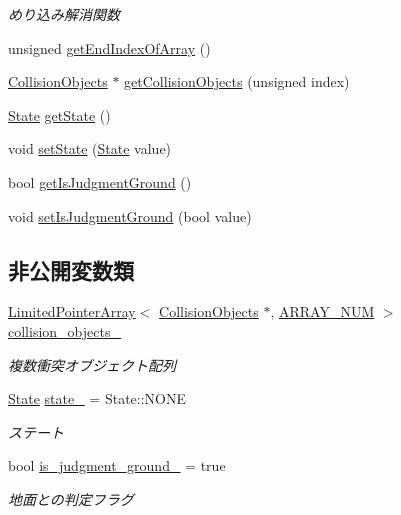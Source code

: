 \begin{DoxyCompactItemize}
\begin{DoxyCompactList}\small\item\em めり込み解消関数 \end{DoxyCompactList}\item 
unsigned \mbox{\hyperlink{class_collision_base_ac1d7000c820fabfa604138cda30a40a1}{get\+End\+Index\+Of\+Array}} ()
\item 
\mbox{\hyperlink{class_collision_objects}{Collision\+Objects}} $\ast$ \mbox{\hyperlink{class_collision_base_a2e54e04c6ebd809ac2bc955083fec61c}{get\+Collision\+Objects}} (unsigned index)
\item 
\mbox{\hyperlink{class_collision_base_a4dd1ed00099a19c0176913af93c4e365}{State}} \mbox{\hyperlink{class_collision_base_af4e773951a4e1965e64410841a0292a4}{get\+State}} ()
\item 
void \mbox{\hyperlink{class_collision_base_a01db1e666b8e71c33969e9ab6bbc724e}{set\+State}} (\mbox{\hyperlink{class_collision_base_a4dd1ed00099a19c0176913af93c4e365}{State}} value)
\item 
bool \mbox{\hyperlink{class_collision_base_a7b9cd927976308f8719f3becc03b99a1}{get\+Is\+Judgment\+Ground}} ()
\item 
void \mbox{\hyperlink{class_collision_base_a231cb5c715701444db63db030c06b694}{set\+Is\+Judgment\+Ground}} (bool value)
\end{DoxyCompactItemize}
\subsection*{非公開変数類}
\begin{DoxyCompactItemize}
\item 
\mbox{\hyperlink{class_limited_pointer_array}{Limited\+Pointer\+Array}}$<$ \mbox{\hyperlink{class_collision_objects}{Collision\+Objects}} $\ast$, \mbox{\hyperlink{class_collision_base_a0ddcdd5ed993b19c6edabd9c50e76ba4}{A\+R\+R\+A\+Y\+\_\+\+N\+UM}} $>$ \mbox{\hyperlink{class_collision_base_a9ef8dfac9a07e31cb1d058b6a22e9640}{collision\+\_\+objects\+\_\+}}
\begin{DoxyCompactList}\small\item\em 複数衝突オブジェクト配列 \end{DoxyCompactList}\item 
\mbox{\hyperlink{class_collision_base_a4dd1ed00099a19c0176913af93c4e365}{State}} \mbox{\hyperlink{class_collision_base_a00000e1adbe3869939c8119a4ae830d0}{state\+\_\+}} = State\+::\+N\+O\+NE
\begin{DoxyCompactList}\small\item\em ステート \end{DoxyCompactList}\item 
bool \mbox{\hyperlink{class_collision_base_acc56eed7a6366d77bb2b80810f0a4ea7}{is\+\_\+judgment\+\_\+ground\+\_\+}} = true
\begin{DoxyCompactList}\small\item\em 地面との判定フラグ \end{DoxyCompactList}\end{DoxyCompactItemize}
